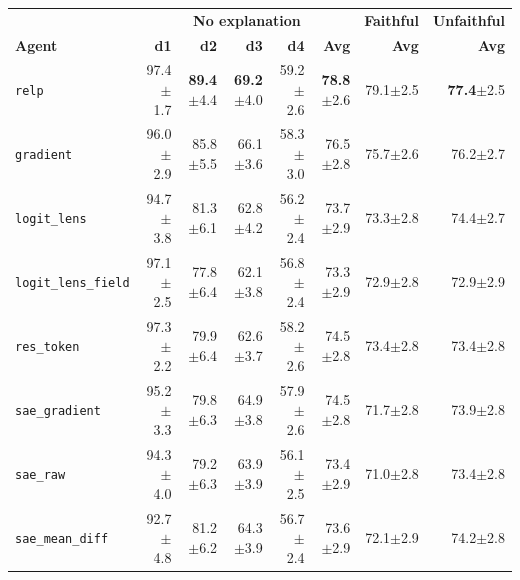 \documentclass{article} %
\begin{document}
\begin{table}[t]
\begin{center}
\footnotesize
\renewcommand{\arraystretch}{1.15}
\begin{tabular}{@{}l rrrr r | r | r@{}}
\toprule
 & \multicolumn{5}{c|}{\textbf{No explanation}} & \textbf{Faithful} & \textbf{Unfaithful} \\
\textbf{Agent} & \textbf{d1} & \textbf{d2} & \textbf{d3} & \textbf{d4} & \textbf{Avg} & \textbf{Avg} & \textbf{Avg} \\
\midrule
\rowcolor{gradrow}
\texttt{relp} & 97.4{\scriptsize$\pm$1.7} & \textbf{89.4}{\scriptsize$\pm$4.4} & \textbf{69.2}{\scriptsize$\pm$4.0} & 59.2{\scriptsize$\pm$2.6} & \textbf{78.8}{\scriptsize$\pm$2.6} & 79.1{\scriptsize$\pm$2.5} & \textbf{77.4}{\scriptsize$\pm$2.5} \\
\rowcolor{gradrow}
\texttt{gradient} & 96.0{\scriptsize$\pm$2.9} & 85.8{\scriptsize$\pm$5.5} & 66.1{\scriptsize$\pm$3.6} & 58.3{\scriptsize$\pm$3.0} & 76.5{\scriptsize$\pm$2.8} & 75.7{\scriptsize$\pm$2.6} & 76.2{\scriptsize$\pm$2.7} \\[3pt]
\texttt{logit\_lens} & 94.7{\scriptsize$\pm$3.8} & 81.3{\scriptsize$\pm$6.1} & 62.8{\scriptsize$\pm$4.2} & 56.2{\scriptsize$\pm$2.4} & 73.7{\scriptsize$\pm$2.9} & 73.3{\scriptsize$\pm$2.8} & 74.4{\scriptsize$\pm$2.7} \\
\texttt{logit\_lens\_field} & 97.1{\scriptsize$\pm$2.5} & 77.8{\scriptsize$\pm$6.4} & 62.1{\scriptsize$\pm$3.8} & 56.8{\scriptsize$\pm$2.4} & 73.3{\scriptsize$\pm$2.9} & 72.9{\scriptsize$\pm$2.8} & 72.9{\scriptsize$\pm$2.9} \\
\texttt{res\_token} & 97.3{\scriptsize$\pm$2.2} & 79.9{\scriptsize$\pm$6.4} & 62.6{\scriptsize$\pm$3.7} & 58.2{\scriptsize$\pm$2.6} & 74.5{\scriptsize$\pm$2.8} & 73.4{\scriptsize$\pm$2.8} & 73.4{\scriptsize$\pm$2.8} \\[3pt]
\texttt{sae\_gradient} & 95.2{\scriptsize$\pm$3.3} & 79.8{\scriptsize$\pm$6.3} & 64.9{\scriptsize$\pm$3.8} & 57.9{\scriptsize$\pm$2.6} & 74.5{\scriptsize$\pm$2.8} & 71.7{\scriptsize$\pm$2.8} & 73.9{\scriptsize$\pm$2.8} \\
\texttt{sae\_raw} & 94.3{\scriptsize$\pm$4.0} & 79.2{\scriptsize$\pm$6.3} & 63.9{\scriptsize$\pm$3.9} & 56.1{\scriptsize$\pm$2.5} & 73.4{\scriptsize$\pm$2.9} & 71.0{\scriptsize$\pm$2.8} & 73.4{\scriptsize$\pm$2.8} \\
\texttt{sae\_mean\_diff} & 92.7{\scriptsize$\pm$4.8} & 81.2{\scriptsize$\pm$6.2} & 64.3{\scriptsize$\pm$3.9} & 56.7{\scriptsize$\pm$2.4} & 73.6{\scriptsize$\pm$2.9} & 72.1{\scriptsize$\pm$2.9} & 74.2{\scriptsize$\pm$2.8} \\

\end{tabular}
\end{center}
\end{table}
\end{document}
